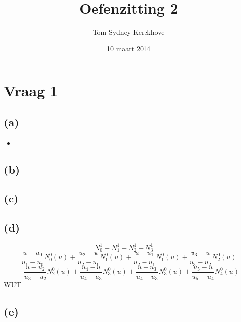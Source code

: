 \documentclass[10pt,a4paper]{article}
\title{Oefenzitting 2}
\author{Tom Sydney Kerckhove}
\date{10 maart 2014}
\begin{document}
\maketitle

\section{Vraag 1}
\subsection*{(a)}
\begin{itemize}
\item

\end{itemize}
\subsection*{(b)}
\subsection*{(c)}
\subsection*{(d)}
\[
N_{0}^{1} + N_{1}^{1} + N_{2}^{1} + N_{3}^{1}
=
\]
\[ 
 \frac{u-u_0}{u_1-u_0}N_{0}^{0}(u)
+\frac{u_2-u}{u_2-u_1}N_{1}^{0}(u)
+\frac{u-u_1}{u_2-u_1}N_{1}^{0}(u)
+\frac{u_3-u}{u_3-u_2}N_{2}^{0}(u)
\]
\[
+\frac{u-u_2}{u_3-u_2}N_{2}^{0}(u)
+\frac{u_4-u}{u_4-u_3}N_{3}^{0}(u)
+\frac{u-u_3}{u_4-u_3}N_{3}^{0}(u)
+\frac{u_5-u}{u_5-u_4}N_{4}^{0}(u)
\]
WUT
\subsection*{(e)}


\end{document}

